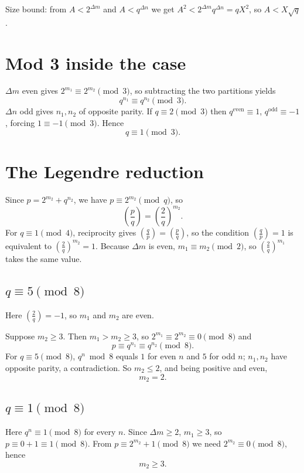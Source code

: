 \documentclass[11pt]{article}
\begin{document}
Size bound: from $A < 2^{\Delta m}$ and $A < q^{\Delta n}$ we get $A^2 < 2^{\Delta m}q^{\Delta n} = qX^2$, so $A < X\sqrt{q}$.

\section*{Mod 3 inside the case}

$\Delta m$ even gives $2^{m_1} \equiv 2^{m_2} \pmod 3$, so subtracting the two partitions yields
\[
q^{n_1} \equiv q^{n_2} \pmod 3.
\]
$\Delta n$ odd gives $n_1, n_2$ of opposite parity. If $q \equiv 2 \pmod 3$ then $q^{\text{even}} \equiv 1$, $q^{\text{odd}} \equiv -1$, forcing $1 \equiv -1 \pmod 3$. Hence
\[
q \equiv 1 \pmod 3.
\]

\section*{The Legendre reduction}

Since $p = 2^{m_2} + q^{n_2}$, we have $p \equiv 2^{m_2} \pmod q$, so
\[
\left(\frac{p}{q}\right) = \left(\frac{2}{q}\right)^{m_2}.
\]
For $q \equiv 1 \pmod 4$, reciprocity gives $\left(\frac{q}{p}\right) = \left(\frac{p}{q}\right)$, so the condition $\left(\frac{q}{p}\right) = 1$ is equivalent to $\left(\frac{2}{q}\right)^{m_2} = 1$. Because $\Delta m$ is even, $m_1 \equiv m_2 \pmod 2$, so $\left(\frac{2}{q}\right)^{m_1}$ takes the same value.

\subsection*{$q \equiv 5 \pmod 8$}

Here $\left(\frac{2}{q}\right) = -1$, so $m_1$ and $m_2$ are even.

Suppose $m_2 \geq 3$. Then $m_1 > m_2 \geq 3$, so $2^{m_1} \equiv 2^{m_2} \equiv 0 \pmod 8$ and
\[
p \equiv q^{n_1} \equiv q^{n_2} \pmod 8.
\]
For $q \equiv 5 \pmod 8$, $q^n \bmod 8$ equals $1$ for even $n$ and $5$ for odd $n$; $n_1, n_2$ have opposite parity, a contradiction. So $m_2 \leq 2$, and being positive and even,
\[
m_2 = 2.
\]

\subsection*{$q \equiv 1 \pmod 8$}

Here $q^n \equiv 1 \pmod 8$ for every $n$. Since $\Delta m \geq 2$, $m_1 \geq 3$, so $p \equiv 0 + 1 \equiv 1 \pmod 8$. From $p \equiv 2^{m_2} + 1 \pmod 8$ we need $2^{m_2} \equiv 0 \pmod 8$, hence
\[
m_2 \geq 3.
\]
\end{document}
